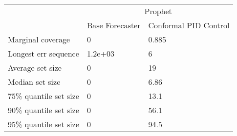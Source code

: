 \begin{tabular}{lll}
\toprule
& \multicolumn{2}{c}{Prophet} \\
& Base Forecaster & Conformal PID Control \\
\midrule
Marginal coverage & 0 & 0.885 \\
Longest err sequence & 1.2e+03 & 6 \\
Average set size & 0 & 19 \\
Median set size & 0 & 6.86 \\
75\% quantile set size & 0 & 13.1 \\
90\% quantile set size & 0 & 56.1 \\
95\% quantile set size & 0 & 94.5 \\
\bottomrule
\end{tabular}

